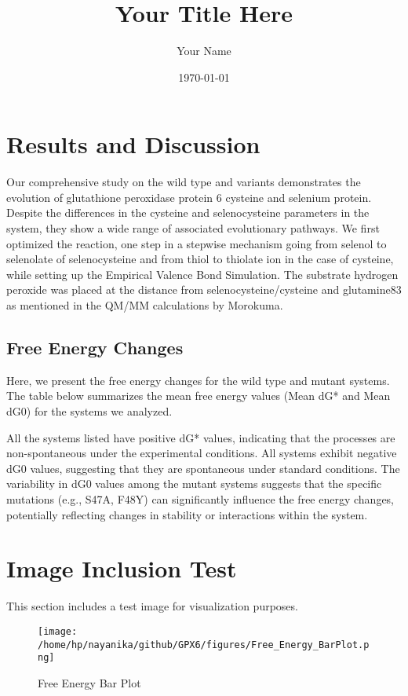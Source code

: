 \documentclass{article}
\begin{document}
\title{Your Title Here}
\author{Your Name}
\date{\today}
\maketitle

\section{Results and Discussion}

Our comprehensive study on the wild type and variants demonstrates the evolution of glutathione peroxidase protein 6 cysteine and selenium protein. 
Despite the differences in the cysteine and selenocysteine parameters in the system, they show a wide range of associated evolutionary pathways. We first optimized the reaction, one step in a stepwise mechanism going from selenol to selenolate of selenocysteine and from thiol to thiolate ion in the case of cysteine, while setting up the Empirical Valence Bond Simulation. The substrate hydrogen peroxide was placed at the distance from selenocysteine/cysteine and glutamine83 as mentioned in the QM/MM calculations by Morokuma.

\subsection{Free Energy Changes}

Here, we present the free energy changes for the wild type and mutant systems. The table below summarizes the mean free energy values (Mean dG* and Mean dG0) for the systems we analyzed.

All the systems listed have positive dG* values, indicating that the processes are non-spontaneous under the experimental conditions. All systems exhibit negative dG0 values, suggesting that they are spontaneous under standard conditions. The variability in dG0 values among the mutant systems suggests that the specific mutations (e.g., S47A, F48Y) can significantly influence the free energy changes, potentially reflecting changes in stability or interactions within the system.



\section{Image Inclusion Test}
This section includes a test image for visualization purposes.

\begin{figure}[H] %
    \centering
    \texttt{[image: /home/hp/nayanika/github/GPX6/figures/Free\_Energy\_BarPlot.png]} %
    \caption{Free Energy Bar Plot}
    \label{fig:free_energy_barplot}
\end{figure}
\end{document}
